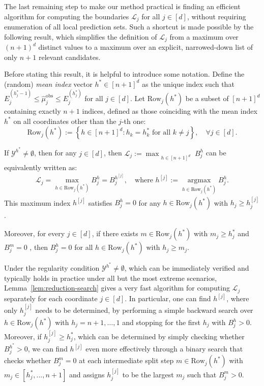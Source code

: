 The last remaining step to make our method practical is finding an efficient algorithm for computing the boundaries $\mathcal{L}_j$ for all $j \in [d]$, without requiring enumeration of all local prediction sets. 
Such a shortcut is made possible by the following result, which simplifies the definition of $\mathcal{L}_j$ from a maximum over $(n+1)^d$ distinct values to a maximum over an explicit, narrowed-down list of only $n+1$ relevant candidates.

Before stating this result, it is helpful to introduce some notation. 
Define the (random) \emph{mean index} vector $h^* \in [n+1]^d$ as the unique index such that $E^{(h^*_j-1)}_j \le \hat{\mu}_j^\mathrm{obs} \le E^{(h^*_j)}_j$ for all $j \in [d]$.
Let $\mathrm{Row}_j(h^*)$ be a subset of $[n+1]^d$ containing exactly $n+1$ indices, defined as those coinciding with the mean index $h^*$ on all coordinates other than the $j$-th one:
\[
\mathrm{Row}_j(h^*):=\left\{h\in[n{+}1]^d : h_k = h^*_k \text{ for all } k\neq j \right\}, \quad\forall j \in [d].
\]

\begin{lemma}
If $\mathcal{Y}^{h^*} \neq \emptyset$, then for any $j \in [d]$, then $\mathcal{L}_j := \max_{\substack{h \in [n+1]^d}}B^h_j$ can be equivalently written as:
    \begin{align*}
    \mathcal{L}_j= \max_{h \in \mathrm{Row}_j(h^*)} B^h_j = B^{h^{[j]}}_j,
      \quad
      \text{where }h^{[j]} := \operatorname*{argmax}_{h \in \mathrm{Row}_j(h^*)} B^h_j.
    \end{align*}
    This maximum index $h^{[j]}$ satisfies $B^{h}_j= 0$ for any $h \in \mathrm{Row}_j(h^*)$ with $h_j \geq h^{[j]}_j$. 
    
    Moreover, for every $j \in [d]$, if there exists $m\in\mathrm{Row}_j(h^*)$ with $m_j\geq h^*_j$ and $B^m_j=0$
    , then $B^h_j=0$ for all $h\in\mathrm{Row}_j(h^*)$ with $h_j \geq m_j$.
    \label{lem:reduction-search}
\end{lemma}

Under the regularity condition $\mathcal{Y}^{h^*} \neq \emptyset$, which can be immediately verified and typically holds in practice under all but the most extreme scenarios, Lemma~\ref{lem:reduction-search} gives a very fast algorithm for computing $\mathcal{L}_j$ separately for each coordinate $j \in [d]$.
In particular, one can find $h^{[j]}$, where only $h^{[j]}_j$ needs to be determined, by performing a simple
backward search over $h \in \mathrm{Row}_j(h^*)$ with $h_j = n+1,\ldots,1$ and stopping for the first $h_j$ with $B^h_j > 0$.
Moreover, if $h^{[j]}_j \geq h^*_j$, which can be determined by simply checking whether $B^{h^*}_j > 0$,
we can find $h^{[j]}$ even more effectively through a binary search that checks whether $B^m_j=0$ at each intermediate split step $m \in \mathrm{Row}_j(h^*)$ with $m_j \in [h^*_j,...,n+1]$ and assigns $h^{[j]}_j$ to be the largest $m_j$ such that $B^{m}_j > 0$.

